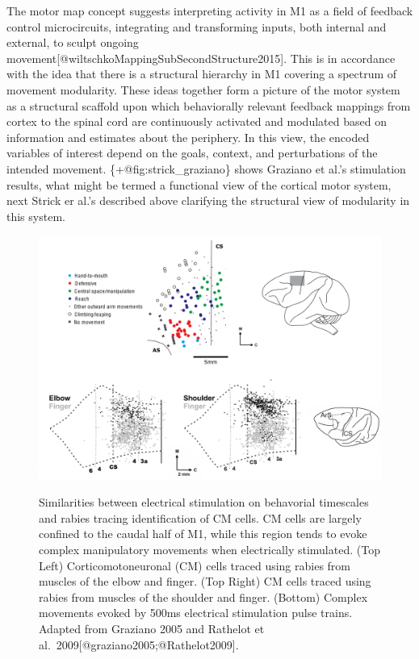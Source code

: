 The motor map concept suggests interpreting activity in M1 as a field of
feedback control microcircuits, integrating and transforming inputs,
both internal and external, to sculpt ongoing
movement{[}@wiltschkoMappingSubSecondStructure2015{]}. This is in
accordance with the idea that there is a structural hierarchy in M1
covering a spectrum of movement modularity. These ideas together form a
picture of the motor system as a structural scaffold upon which
behaviorally relevant feedback mappings from cortex to the spinal cord
are continuously activated and modulated based on information and
estimates about the periphery. In this view, the encoded variables of
interest depend on the goals, context, and perturbations of the intended
movement. \{+@fig:strick\_graziano\} shows Graziano et al.'s stimulation
results, what might be termed a functional view of the cortical motor
system, next Strick er al.'s described above clarifying the structural
view of modularity in this system.

\begin{figure}
\label{fig:strick_graziano}
\centering
\includegraphics[width=1\textwidth,height=\textheight]{images/physiology/strick_graziano/strick_graziano.pdf}
\caption{Similarities between electrical stimulation on behavorial
timescales and rabies tracing identification of CM cells. CM cells are
largely confined to the caudal half of M1, while this region tends to
evoke complex manipulatory movements when electrically stimulated. (Top
Left) Corticomotoneuronal (CM) cells traced using rabies from muscles of
the elbow and finger. (Top Right) CM cells traced using rabies from
muscles of the shoulder and finger. (Bottom) Complex movements evoked by
500ms electrical stimulation pulse trains. Adapted from Graziano 2005
and Rathelot et
al.~2009{[}@graziano2005;@Rathelot2009{]}.}\label{fig:strick_graziano}
\end{figure}

